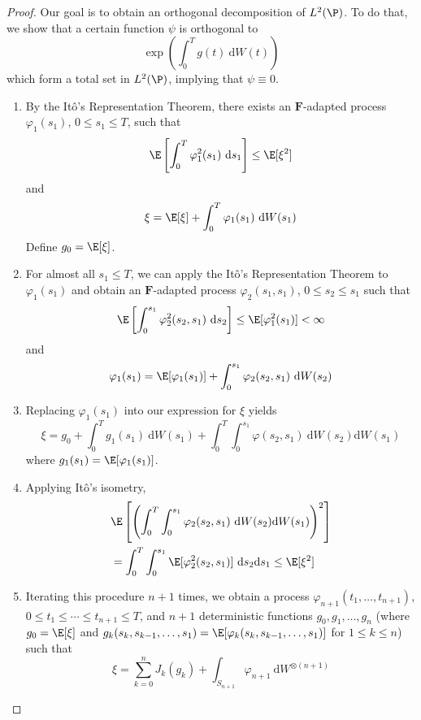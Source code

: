 \begin{proof}
    Our goal is to obtain an orthogonal decomposition of $L^2(\P)$. To do that, we show that a certain function $\psi$ is orthogonal to \[ \exp \left( \int_0^T g(t) ~\mathrm{d}W(t) \right) \] which form a total set in $L^2(\P)$, implying that $\psi \equiv 0$.

\begin{enumerate}
    \item By the Itô's Representation Theorem, there exists an $\mathbf{F}$-adapted process $\varphi_1(s_1)$, $0 \le s_1 \le T$, such that 
    \[
    \E \left[ \int_0^T \varphi_1^2(s_1) ~\mathrm{d}s_1 \right] \le \E [\xi^2]
    \]
    and 
    \[
    \xi = \E [\xi] + \int_0^T \varphi_1(s_1) ~\mathrm{d}W(s_1)    
    \]
    Define $g_0 = \E [\xi]$.
    
    \item For almost all $s_1 \le T$, we can apply the Itô's Representation Theorem to $\varphi_1(s_1)$ and obtain an $\mathbf{F}$-adapted process $\varphi_2(s_1, s_1)$, $0 \le s_2 \le s_1$ such that 
    \[
        \E \left[ \int_0^{s_1} \varphi_2^2(s_2, s_1) ~\mathrm{d}s_2 \right] \le \E [\varphi_1^2(s_1)] < \infty
    \]
    and 
    \[
    		\varphi_1(s_1) = \E [\varphi_1(s_1)] + \int_0^{s_1} \varphi_2(s_2, s_1) ~\mathrm{d}W(s_2)    
    \]
    
	\item Replacing $\varphi_1(s_1)$ into our expression for $\xi$ yields
	\[
	\xi = g_0 + \int_0^T g_1(s_1) ~\mathrm{d}W(s_1) + \int_0^T \int_0^{s_1} \varphi(s_2, s_1) ~\mathrm{d}W(s_2) \mathrm{d}W(s_1)
	\]
	where $g_1(s_1) = \E [\varphi_1(s_1)]$.
	
	\item Applying Itô's isometry, 
	\begin{equation}
	\begin{aligned}
	&\E \left[ \left( \int_0^T \int_0^{s_1} \varphi_2(s_2, s_1) ~\mathrm{d}W(s_2) \mathrm{d}W(s_1) \right)^2 \right] \\
	&= \int_0^T \int_0^{s_1} \E [\varphi_2^2(s_2, s_1)] ~\mathrm{d}s_2 \mathrm{d}s_1 \le \E [\xi^2]
	\end{aligned}	
	\end{equation}	
    
    \item Iterating this procedure $n+1$ times, we obtain a process $\varphi_{n+1}(t_1, \ldots, t_{n+1})$, $0 \le t_1 \le \cdots \le t_{n+1} \le T$, and $n+1$ deterministic functions $g_0, g_1, \ldots, g_n$ (where $g_0 = \E[\xi]$ and $g_k(s_k, s_{k-1}, \ldots, s_1) = \E[\varphi_k(s_k, s_{k-1}, \ldots, s_1)]$ for $1 \le k \le n$) such that 
        $$
        \xi = \sum_{k=0}^n J_k(g_k) + \int_{S_{n+1}} \varphi_{n+1} ~\mathrm{d}W^{\otimes(n+1)}
        $$
	

\end{enumerate}
\end{proof}
